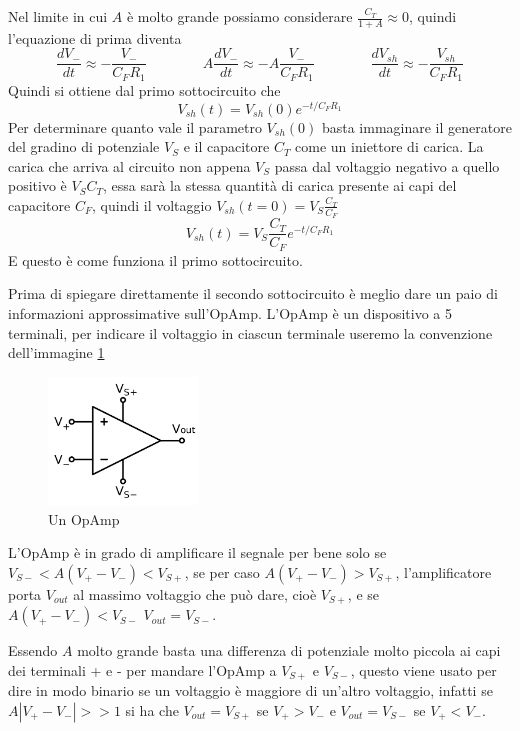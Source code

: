 \documentclass{article}
\newcommand{\vz}{V_{sh}(0)}
\begin{document}
		Nel limite in cui $A$ è molto grande possiamo considerare $\frac{C_T}{1+A}\approx0$, quindi l'equazione di prima diventa
		\[
			\frac{dV_-}{dt}\approx-\frac{V_-}{C_FR_1}\qquad\qquad
			A\frac{dV_-}{dt}\approx-A\frac{V_-}{C_FR_1}\qquad\qquad
			\frac{dV_{sh}}{dt}\approx-\frac{V_{sh}}{C_FR_1}
		\]
		Quindi si ottiene dal primo sottocircuito che\newline
		\[
			V_{sh}(t)=V_{sh}(0)e^{-t/C_FR_1}
		\]
		Per determinare quanto vale il parametro $\vz$ basta immaginare il generatore del gradino di potenziale $V_S$ e il capacitore $C_T$ come un iniettore di carica.\newline
		La carica che arriva al circuito non appena $V_S$ passa dal voltaggio negativo a quello positivo è $V_SC_T$, essa sarà la stessa quantità di carica presente ai capi del capacitore $C_F$, quindi il voltaggio $V_{sh}(t=0)=V_S\frac{C_T}{C_F}$
		\begin{equation}
			V_{sh}(t)=V_S\frac{C_T}{C_F}e^{-t/C_FR_1}	
		\end{equation}
		E questo è come funziona il primo sottocircuito.\newline

		Prima di spiegare direttamente il secondo sottocircuito è meglio dare un paio di informazioni approssimative sull'OpAmp.\newline
		L'OpAmp è un dispositivo a 5 terminali, per indicare il voltaggio in ciascun terminale useremo la convenzione dell'immagine \ref{fig:OpAmp1}\newline
		\begin{figure}
			\centering
			\includegraphics[width=40mm]{immagini/OpAmp1.png}
			\caption{Un OpAmp}
			\label{fig:OpAmp1}
		\end{figure}
		L'OpAmp è in grado di amplificare il segnale per bene solo se $V_{S-}<A(V_+-V_-)<V_{S+}$, se per caso $A(V_+-V_-)>V_{S+}$, l'amplificatore porta $V_{out}$ al massimo voltaggio che può dare, cioè $V_{S+}$, e se $A(V_+-V_-)<V_{S-}$ $V_{out}=V_{S-}$.\newline

		Essendo $A$ molto grande basta una differenza di potenziale molto piccola ai capi dei terminali + e - per mandare l'OpAmp a $V_{S+}$ e $V_{S-}$, questo viene usato per dire in modo binario se un voltaggio è maggiore di un'altro voltaggio, infatti se $A|V_+-V_-|>>1$ si ha che $V_{out}=V_{S+}$ se $V_+>V_-$ e $V_{out}=V_{S-}$ se $V_+<V_-$.\newline
\end{document}
